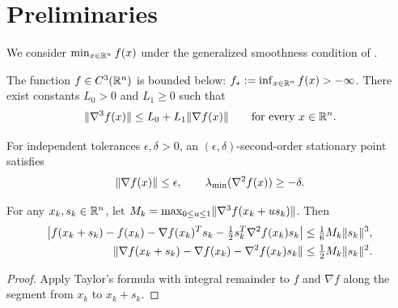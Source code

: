 \section{Preliminaries}
\label{sec:setting}
We consider $\min_{x\in\mathbb R^n}f(x)$ under the generalized smoothness
condition of \citet[Assumption~1]{fang2026parameter}.

\begin{assumption}\label{ass:setting}
The function $f\in C^3(\mathbb R^n)$ is bounded below:
$f_*:=\inf_{x\in\mathbb R^n}f(x)>-\infty$. There exist constants
$L_0>0$ and $L_1\ge0$ such that
\begin{equation}\label{eq:assumption}
 \lVert\nabla^3 f(x)\rVert\le L_0+L_1\lVert\nabla f(x)\rVert
 \qquad\text{for every }x\in\mathbb R^n.
\end{equation}
\end{assumption}

For independent tolerances
$\epsilon,\delta>0$, an $(\epsilon,\delta)$-second-order stationary
point satisfies
\begin{equation}\label{eq:stationarity}
 \lVert\nabla f(x)\rVert\le\epsilon,\qquad
 \lambda_{\min}(\nabla^2 f(x))\ge-\delta.
\end{equation}

\begin{lemma}\label{lem:taylor-remainders}
For any $x_k,s_k\in\mathbb R^n$, let
$M_k=\max_{0\le u\le1}\lVert\nabla^3f(x_k+us_k)\rVert$. Then
\begin{subequations}
\begin{align}
 \bigl|f(x_k+s_k)-f(x_k)-\nabla f(x_k)^Ts_k
               -\tfrac12s_k^T\nabla^2f(x_k)s_k\bigr|
 &\le \tfrac16 M_k\lVert s_k\rVert^3, \label{eq:taylor-value}\\
 \lVert\nabla f(x_k+s_k)-\nabla f(x_k)-\nabla^2f(x_k)s_k\rVert
 &\le \tfrac12 M_k\lVert s_k\rVert^2. \label{eq:taylor-gradient}
\end{align}
\end{subequations}
\end{lemma}
\begin{proof}
Apply Taylor's formula with integral remainder to $f$ and $\nabla f$ along the segment from $x_k$ to $x_k+s_k$.
\end{proof}
